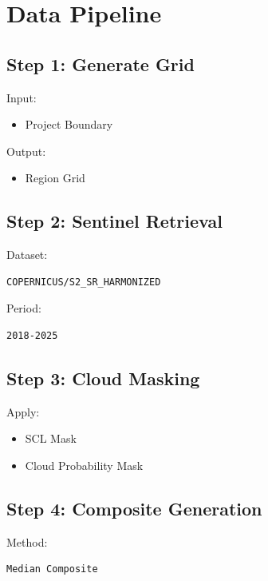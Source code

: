 \documentclass[11pt,a4paper]{article}
\begin{document}
\section{Data Pipeline}

\subsection{Step 1: Generate Grid}

Input:

\begin{itemize}
\item Project Boundary
\end{itemize}

Output:

\begin{itemize}
\item Region Grid
\end{itemize}

\subsection{Step 2: Sentinel Retrieval}

Dataset:

\begin{verbatim}
COPERNICUS/S2_SR_HARMONIZED
\end{verbatim}

Period:

\begin{verbatim}
2018-2025
\end{verbatim}

\subsection{Step 3: Cloud Masking}

Apply:

\begin{itemize}
\item SCL Mask
\item Cloud Probability Mask
\end{itemize}

\subsection{Step 4: Composite Generation}

Method:

\begin{verbatim}
Median Composite
\end{verbatim}
\end{document}
